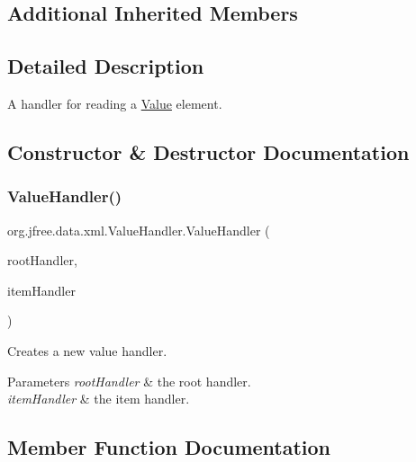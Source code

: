 \subsection*{Additional Inherited Members}


\subsection{Detailed Description}
A handler for reading a \textquotesingle{}\mbox{\hyperlink{interfaceorg_1_1jfree_1_1data_1_1_value}{Value}}\textquotesingle{} element. 

\subsection{Constructor \& Destructor Documentation}
\mbox{\label{classorg_1_1jfree_1_1data_1_1xml_1_1_value_handler_a91dbc9d98407018855bc3ae074b4f209}} 
\subsubsection{\texorpdfstring{Value\+Handler()}{ValueHandler()}}
{\footnotesize\ttfamily org.\+jfree.\+data.\+xml.\+Value\+Handler.\+Value\+Handler (\begin{DoxyParamCaption}\item[{\mbox{\hyperlink{classorg_1_1jfree_1_1data_1_1xml_1_1_root_handler}{Root\+Handler}}}]{root\+Handler,  }\item[{\mbox{\hyperlink{classorg_1_1jfree_1_1data_1_1xml_1_1_item_handler}{Item\+Handler}}}]{item\+Handler }\end{DoxyParamCaption})}

Creates a new value handler.


\begin{DoxyParams}{Parameters}
{\em root\+Handler} & the root handler. \\
\hline
{\em item\+Handler} & the item handler. \\
\hline
\end{DoxyParams}


\subsection{Member Function Documentation}
\mbox{\label{classorg_1_1jfree_1_1data_1_1xml_1_1_value_handler_a112f063d621e58b138aa2e05dc532051}} 
